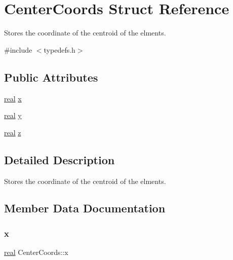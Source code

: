 \hypertarget{structCenterCoords}{}\section{Center\+Coords Struct Reference}
\label{structCenterCoords}


Stores the coordinate of the centroid of the elments.  




{\ttfamily \#include $<$typedefs.\+h$>$}

\subsection*{Public Attributes}
\begin{DoxyCompactItemize}
\item 
\mbox{\hyperlink{definitions_8h_aedc0ad84d1e764530814f57ad931d02a}{real}} \mbox{\hyperlink{structCenterCoords_a4280c01a2667af110ab36d3623e5d525}{x}}
\item 
\mbox{\hyperlink{definitions_8h_aedc0ad84d1e764530814f57ad931d02a}{real}} \mbox{\hyperlink{structCenterCoords_a59ec0ed1ccaae4d32dad457cba501445}{y}}
\item 
\mbox{\hyperlink{definitions_8h_aedc0ad84d1e764530814f57ad931d02a}{real}} \mbox{\hyperlink{structCenterCoords_a94d9e8682d79ead6062b061c3c8e5138}{z}}
\end{DoxyCompactItemize}


\subsection{Detailed Description}
Stores the coordinate of the centroid of the elments. 

\subsection{Member Data Documentation}
\mbox{\label{structCenterCoords_a4280c01a2667af110ab36d3623e5d525}} 
\subsubsection{\texorpdfstring{x}{x}}
{\footnotesize\ttfamily \mbox{\hyperlink{definitions_8h_aedc0ad84d1e764530814f57ad931d02a}{real}} Center\+Coords\+::x}

\mbox{\label{structCenterCoords_a59ec0ed1ccaae4d32dad457cba501445}} 
